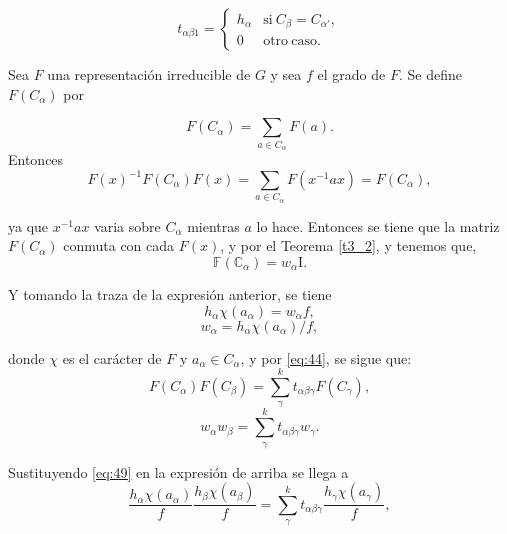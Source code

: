\documentclass[12pt]{book}
\theoremstyle{definition}
\newcounter{in}
\begin{document}
\begin{equation}
  \label{eq:46}
   t_{\alpha \beta 1} = \left\{
     \begin{array}{ll}
       h_{\alpha}      & \mathrm{si\ } C_{\beta} = C_{\alpha '}, \\
       0      & \mathrm{otro\ caso.\ } 
     \end{array}
   \right.
\end{equation}

Sea $F$ una representación irreducible
de $G$ y sea $f$ el grado de $F$. Se define
$F (C_{\alpha})$ por

\begin{equation}
  \label{eq:45}
  F (C_{\alpha}) = \sum_{a \in C_{\alpha}} F(a).
\end{equation}
Entonces
\begin{equation}
  \label{eq:47}
  F(x)^{-1}F(C_{\alpha})F(x)=\sum_{a \in C_{\alpha}}F(x^{-1}ax)=F(C_{\alpha}),
\end{equation}

ya que $x^{-1}ax$ varia sobre $C_{\alpha}$ mientras $a$ lo
hace. Entonces se tiene que la matriz $F (C_{\alpha})$ conmuta con cada $F(x)$, y
por el Teorema \ref{t3_2}, y tenemos que,
\begin{equation}
  \label{eq:48}
   \mathbb{F} (\mathbb{C}_{\alpha})=w_{\alpha}\mathrm{I}.
\end{equation}

Y tomando la traza de la expresión anterior, se tiene
\begin{equation}
  \label{eq:49}
  h_{\alpha}\chi(a_{\alpha})=w_{\alpha}f,
\end{equation}
\begin{equation}
  \label{eq:50}
  w_{\alpha}=h_{\alpha}\chi(a_{\alpha})/f,
\end{equation}

donde $\chi$ es el carácter de $F$ y
$a_{\alpha} \in C_{\alpha}$, y por \ref{eq:44}, se sigue que:
\begin{equation}
  \label{eq:51}
  F (C_{\alpha})  F (C_{\beta}) = \sum_{\gamma}^{k} t_{\alpha \beta \gamma} F(C_{\gamma}),
\end{equation}
\begin{equation}
  \label{eq:52}
  w_{\alpha}w_{\beta} = \sum_{\gamma}^{k} t_{\alpha \beta \gamma} w_{\gamma}.
\end{equation}

Sustituyendo \ref{eq:49} en la expresión de arriba se llega a
\begin{equation*}
  \frac{h_{\alpha} \chi(a_{\alpha})}{f} \frac{h_{\beta} \chi(a_{\beta})}{f} = \sum_{\gamma}^{k} t_{\alpha \beta \gamma} \frac{h_{\gamma} \chi(a_{\gamma})}{f},
\end{equation*}
\end{document}

